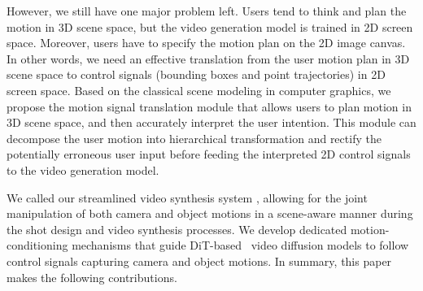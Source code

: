 However, we still have one major problem left. 
Users tend to think and plan the motion in 3D scene space, but the video generation model is trained in 2D screen space. 
Moreover, users have to specify the motion plan on the 2D image canvas. 
In other words, we need an effective translation from the user motion plan in 3D scene space to control signals (bounding boxes and point trajectories) in 2D screen space. 
Based on the classical scene modeling in computer graphics, we propose the motion signal translation module that allows users to plan motion in 3D scene space, and then accurately interpret the user intention. 
This module can decompose the user motion into hierarchical transformation and rectify the potentially erroneous user input before feeding the interpreted 2D control signals to the video generation model.








We called our streamlined video synthesis system \MOCA,
allowing for the joint manipulation of both camera and object motions in a scene-aware manner during the shot design and video synthesis processes. 
We develop dedicated motion-conditioning mechanisms that guide DiT-based~\cite{peebles2023scalable} video diffusion models to follow control signals capturing camera and object motions. 
In summary, this paper makes the following contributions.

